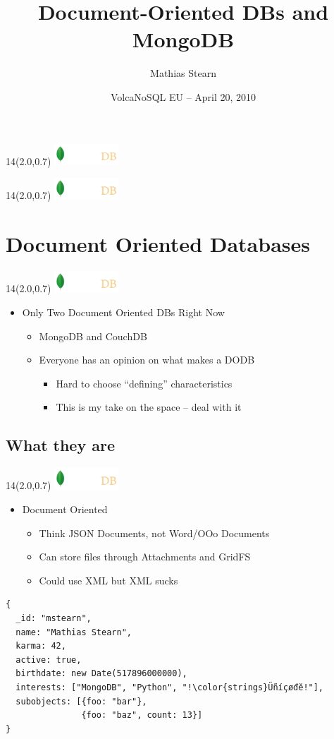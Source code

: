 \documentclass{beamer}
\title{Document-Oriented DBs and MongoDB}
\author{Mathias Stearn}
\institute{10gen}
\date{VolcaNoSQL EU -- April 20, 2010}
\newcommand{\MongoLogo}{
\begin{textblock}{14}(2.0,0.7)
  \includegraphics[height=0.8cm]{logo-mongodb-ondark.png}
\end{textblock}
}
\begin{document}
\begin{frame}
  \MongoLogo
  \titlepage
\end{frame}

\begin{frame}
  \MongoLogo
  \tableofcontents
\end{frame}

\section{Document Oriented Databases}

\begin{frame}
  \MongoLogo
  \begin{itemize}
    \item Only Two Document Oriented DBs Right Now
    \begin{itemize}
      \item MongoDB and CouchDB
      \item Everyone has an opinion on what makes a DODB
      \begin{itemize}
        \item Hard to choose ``defining'' characteristics
        \item This is my take on the space -- deal with it
      \end{itemize}
    \end{itemize}
  \end{itemize}
\end{frame}

\subsection{What they are}
\begin{frame}[fragile]
  \MongoLogo
  \begin{itemize}
    \item Document Oriented
    \begin{itemize}
      \item Think JSON Documents, not Word/OOo Documents
      \item Can store files through Attachments and GridFS
      \item Could use XML but XML sucks
    \end{itemize}
  \end{itemize}

  \begin{lstlisting}
{
  _id: "mstearn",
  name: "Mathias Stearn",
  karma: 42,
  active: true,
  birthdate: new Date(517896000000),
  interests: ["MongoDB", "Python", "!\color{strings}Üñíçøđĕ!"],
  subobjects: [{foo: "bar"},
               {foo: "baz", count: 13}]
}
  \end{lstlisting}
\end{frame}
\end{document}
